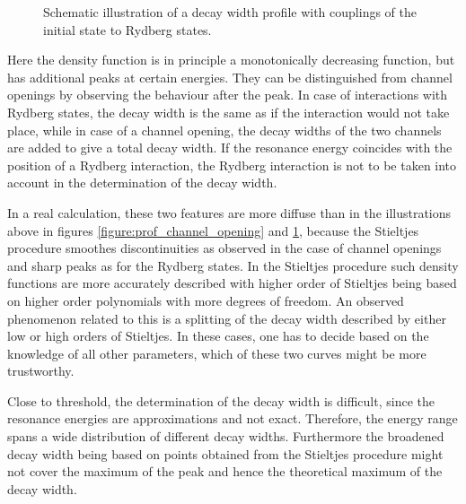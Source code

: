 \begin{figure}[h]
  \centering
  
  \caption{Schematic illustration of a decay width profile with couplings
           of the initial state to Rydberg states.}
  \label{figure:prof_rydberg}
\end{figure}
Here the density function is in principle a monotonically decreasing function,
but has additional peaks at certain energies. They can be distinguished from
channel openings by observing the behaviour after the peak. In case of
interactions with Rydberg states, the decay width is the same as if the interaction
would not take place, while in case of a channel opening, the decay widths
of the two channels are added to give a total decay width.
If the resonance energy coincides with the position of a Rydberg interaction,
the Rydberg interaction is not to be taken into account in the determination
of the decay width.

In a real calculation, these two features are more diffuse than in the
illustrations above in
figures \ref{figure:prof_channel_opening}
and \ref{figure:prof_rydberg}, because the Stieltjes procedure smoothes
discontinuities as observed in the case of channel openings and sharp peaks
as for the Rydberg states.
In the Stieltjes procedure such density functions are more accurately described
with higher order of Stieltjes being based on higher order polynomials
with more degrees of freedom.
An observed phenomenon related to this is
a splitting of the decay width described by either low or high orders of Stieltjes.
In these cases, one has to decide based on the knowledge of all other
parameters, which of these two curves might be more trustworthy.

Close to threshold, the determination of the decay width is difficult, since
the resonance energies are approximations and not exact. Therefore, the
energy range spans a wide distribution of different decay widths. Furthermore
the broadened decay width being based on points obtained from the Stieltjes
procedure might not cover the maximum of the peak and hence the theoretical
maximum of the decay width.
